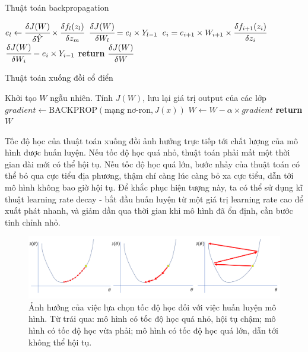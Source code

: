 \documentclass[12pt]{extreport}
\begin{document}
\begin{algorithm}[H]
    \caption{Thuật toán backpropagation}
    \begin{algorithmic}[1]
        \State $ e_l \gets \cfrac{\delta J(W)}{\delta \hat{Y}} \times \cfrac{\delta f_l(z_l)}{\delta z_m} $
        \State $ \cfrac{\delta J(W)}{\delta W_l} = e_l \times Y_{l - 1} $
        \State $ e_i = e_{i + 1} \times W_{i + 1} \times \cfrac{\delta f_{i + 1}(z_i)}{\delta z_i} $
        \State $ \cfrac{\delta J(W)}{\delta W_i} = e_i \times Y_{i - 1} $
        \EndFor
        \State \textbf{return} $ \cfrac{\delta J(W)}{\delta W} $
        \EndProcedure
    \end{algorithmic}
\end{algorithm}

\begin{algorithm}[H]
    \caption{Thuật toán xuống đồi cổ điển}
    \begin{algorithmic}[1]
        \State Khởi tạo $ W $ ngẫu nhiên.
        \State Tính $ J(W) $, lưu lại giá trị output của các lớp
        \State $ gradient \gets \text{BACKPROP}(\text{mạng nơ-ron}, J(x)) $
        \State $ W \gets W - \alpha \times gradient $
        \EndFor
        \State \textbf{return} $ W $
        \EndProcedure
    \end{algorithmic}
\end{algorithm}

Tốc độ học của thuật toán xuống đồi ảnh hưởng trực tiếp tới chất lượng của mô hình được huấn luyện. Nếu tốc độ học quá nhỏ, thuật toán phải mất một thời gian dài mới có thể hội tụ. Nếu tốc độ học quá lớn, bước nhảy của thuật toán có thể bỏ qua cực tiểu địa phương, thậm chí càng lúc càng bỏ xa cực tiểu, dẫn tới mô hình không bao giờ hội tụ. Để khắc phục hiện tượng này, ta có thể sử dụng kĩ thuật learning rate decay - bắt đầu huấn luyện từ một giá trị learning rate cao để xuất phát nhanh, và giảm dần qua thời gian khi mô hình đã ổn định, cần bước tinh chỉnh nhỏ.

\begin{figure}[H]
    \centering
    \includegraphics[width=\textwidth]{figure11.png}
    \caption{Ảnh hưởng của việc lựa chọn tốc độ học đối với việc huấn luyện mô hình. Từ trái qua: mô hình có tốc độ học quá nhỏ, hội tụ chậm; mô hình có tốc độ học vừa phải; mô hình có tốc độ học quá lớn, dẫn tới không thể hội tụ.}
\end{figure}
\end{document}
